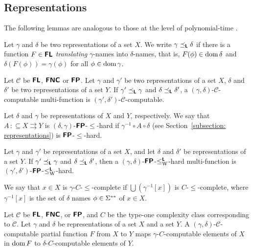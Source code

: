 \documentclass[envcountsame,orivec,oribibl]{llncs}
\newcommand{\pcolon}{\mathpunct{\,:\subseteq}}
\begin{document}
\subsection{Representations}
\newcommand{\transL}{\preceq_\classLtwo}

The following lemmas are analogous to 
those at the level of polynomial-time \cite{kawamura2012complexity}. 

\begin{definition}
Let $\gamma$ and $\delta$ be two representations of a set $X$.
We write $\gamma \transL \delta$ if
there is a function $F \in \text{\bfseries \sffamily \upshape FL}$ \emph{translating} $\gamma$-names
into $\delta$-names, that is, 
$F (\phi) \in \mathop{\rm dom} \delta$ and $\delta(F(\phi)) = \gamma (\phi)$ 
for all $\phi \in \mathop{\rm dom} \gamma$.
\end{definition}

\begin{lemma}
 Let $\mathcal{C}$ be $\text{\bfseries \sffamily \upshape FL}$, $\text{\bfseries \sffamily \upshape FNC}$ or
 $\text{\bfseries \sffamily \upshape FP}$.
 Let $\gamma$ and $\gamma'$ be two representations of a set $X$, 
 $\delta$ and $\delta'$ be two representations of a set $Y$.
 If $\gamma' \transL \gamma$ and $\delta \transL \delta'$,
 a $(\gamma, \delta)$-$\mathcal C$-computable multi-function is
 $(\gamma', \delta')$-$\mathcal C$-computable.
\end{lemma}

Let $\delta$ and $\gamma$ be representations of $X$ and $Y$, respectively.
We say that $A \pcolon X \rightrightarrows Y$ is $(\delta, \gamma)$-$\text{\bfseries \sffamily \upshape FP}$-$\le$-hard 
if $\gamma^{-1} \circ A \circ \delta$ (see Section~\ref{subsection: representations}) is $\text{\bfseries \sffamily \upshape FP}$-$\le$-hard.

\begin{lemma}
 Let $\gamma$ and $\gamma'$ be representations of a set $X$, 
 and let $\delta$ and $\delta'$ be representations of a set $Y$.
 If $\gamma' \transL \gamma$ and $\delta \transL \delta'$,
 then a $(\gamma, \delta)$-$\text{\bfseries \sffamily \upshape FP}$-$\leq _{\mathrm W} ^{\text{\bfseries \sffamily \upshape L}}$-hard multi-function is
 $(\gamma', \delta')$-$\text{\bfseries \sffamily \upshape FP}$-$\leq _{\mathrm W} ^{\text{\bfseries \sffamily \upshape L}}$-hard.
\end{lemma}

We say that $x \in X$ is $\gamma$-$C$-$\le$-complete if
$\bigcup(\gamma^{-1}[x])$ is $C$-$\le$-complete,
where $\gamma^{-1}[x]$ is the set of $\delta$ names $\phi \in \Sigma ^{**}$ of $x \in X$.

\begin{lemma}
 Let $\mathcal C$ be $\text{\bfseries \sffamily \upshape FL}$, $\text{\bfseries \sffamily \upshape FNC}$, 
 or $\text{\bfseries \sffamily \upshape FP}$, and $C$ be the type-one complexity class
 corresponding to $\mathcal C$.
 Let $\gamma$ and $\delta$ be representations of a set $X$ and a set $Y$.
 A $(\gamma, \delta)$-$\mathcal C$-computable partial function $F$ from $X$
 to $Y$ maps $\gamma$-$C$-computable elements of $X$
 in $\mathop{\rm dom} F$ to $\delta$-$C$-computable elements of $Y$.
\end{lemma}
\end{document}
